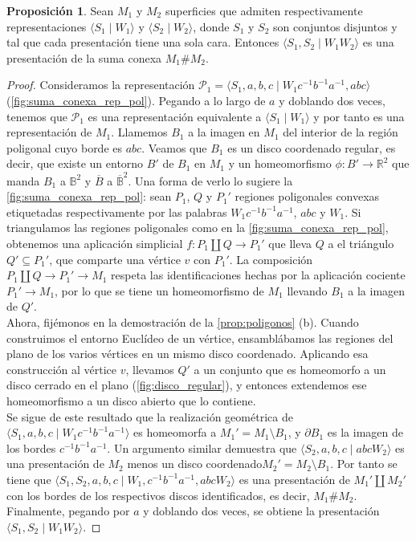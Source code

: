 \documentclass[10pt]{report}
\newcommand{\R}{\mathbb{R}}
\theoremstyle{definition}
\newtheorem{prop}[defin]{Proposición}
\begin{document}
\begin{prop}%
Sean $M_1$ y $M_2$ superficies que admiten respectivamente representaciones $\langle S_1\mid W_1\rangle $ y $\langle S_2\mid W_2\rangle $, donde $S_1$ y $S_2$ son conjuntos disjuntos y tal que cada presentación tiene una sola cara. Entonces $\langle S_1,S_2\mid W_1W_2\rangle$ es una presentación de la suma conexa $M_1 \# M_2$.
\end{prop}

\begin{proof}
Consideramos la representación $\mathcal{P}_1=\langle S_1,a,b,c\mid W_1c^{-1}b^{-1}a^{-1},abc\rangle$ (\autoref{fig:suma_conexa_rep_pol}). Pegando a lo largo de $a$ y doblando dos veces, tenemos que $\mathcal{P}_1$ es una representación equivalente a $\langle S_1\mid W_1\rangle$ y por tanto es una representación de $M_1$. Llamemos $B_1$ a la imagen en $M_1$ del interior de la región poligonal cuyo borde es $abc$. Veamos que $B_1$ es un disco coordenado regular, es decir, que existe un entorno $B'$ de $B_1$ en $M_1$ y un homeomorfismo $\phi :B'\to \R^2$ que manda $B_1$ a $\mathbb{B}^2$ y $\overline{B}$ a $\overline{\mathbb{B}}^2$. Una forma de verlo lo sugiere la \autoref{fig:suma_conexa_rep_pol}: sean $P_1$, $Q$ y $P_1'$ regiones poligonales convexas etiquetadas respectivamente por las palabras $W_1c^{-1}b^{-1}a^{-1}$, $abc$ y $W_1$. Si triangulamos las regiones poligonales como en la  \autoref{fig:suma_conexa_rep_pol}, obtenemos una aplicación simplicial $f:P_1\amalg Q\to P_1'$ que lleva $Q$ a el triángulo $Q'\subseteq P_1'$, que comparte una vértice $v$ con $P_1'$. La composición $P_1\amalg Q\to P_1'\to M_1$ respeta las identificaciones hechas por la aplicación cociente $P_1'\to M_1$, por lo que se tiene un homeomorfismo de $M_1$ llevando $B_1$ a la imagen de $Q'$.\\
Ahora, fijémonos en la demostración de la \autoref{prop:poligonos} (b). Cuando construimos el entorno Euclídeo de un vértice, ensamblábamos las regiones del plano de los varios vértices en un mismo disco coordenado. Aplicando esa construcción al vértice $v$, llevamos $Q'$ a un conjunto que es homeomorfo a un disco cerrado en el plano (\autoref{fig:disco_regular}), y  entonces extendemos ese homeomorfismo a un disco abierto que lo contiene.\\
Se sigue de este resultado que la realización geométrica de $\langle S_1,a,b,c\mid W_1c^{-1}b^{-1}a^{-1}\rangle$ es homeomorfa a $M_1'=M_1\setminus B_1$, y $\partial B_1$ es la imagen de los bordes $c^{-1}b^{-1}a^{-1}$. Un argumento similar demuestra que $\langle S_2,a,b,c\mid abcW_2\rangle$ es una presentación de $M_2$ menos un disco coordenado$M_2'=M_2\setminus B_1$. Por tanto se tiene que $\langle S_1,S_2,a,b,c\mid W_1,c^{-1}b^{-1}a^{-1},abcW_2\rangle$ es una presentación de $M_1'\amalg M_2'$ con los bordes de los respectivos discos identificados, es decir, $M_1\# M_2$. Finalmente, pegando por $a$ y doblando dos veces, se obtiene la presentación $\langle S_1,S_2\mid W_1W_2\rangle$.
\end{proof}
\end{document}
